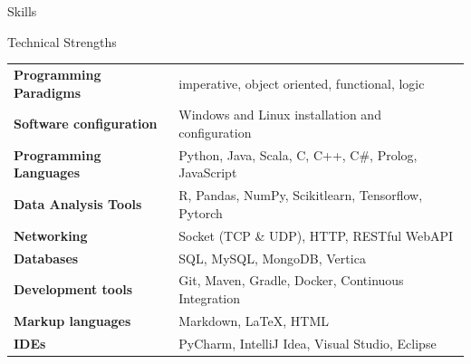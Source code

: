 \documentclass{resume} %
\begin{document}
\begin{rSection}{Skills}
        \begin{rNoListSubsection}{Technical Strengths}{}{}{}
            \begin{center}
                \begin{tabular}{ @{} >{\bfseries}l @{\hspace{6ex}} l }
                    Programming Paradigms	& imperative, object oriented, functional, logic\\
                    Software configuration 	& Windows and Linux installation and configuration\\
                    Programming Languages 	& Python, Java, Scala, C, C++, C\#, Prolog, JavaScript\\
                    Data Analysis Tools		& R, Pandas, NumPy, Scikitlearn, Tensorflow, Pytorch\\
                    Networking 				& Socket (TCP \& UDP), HTTP, RESTful WebAPI \\
                    Databases 				& SQL, MySQL, MongoDB, Vertica \\
                    Development tools 		& Git, Maven, Gradle, Docker, Continuous Integration \\
                    Markup languages 		& Markdown, \LaTeX, HTML\\
                    IDEs 					& PyCharm, IntelliJ Idea, Visual Studio, Eclipse
                \end{tabular}
            \end{center}
        \end{rNoListSubsection}



    \end{rSection}
    
\end{document}
